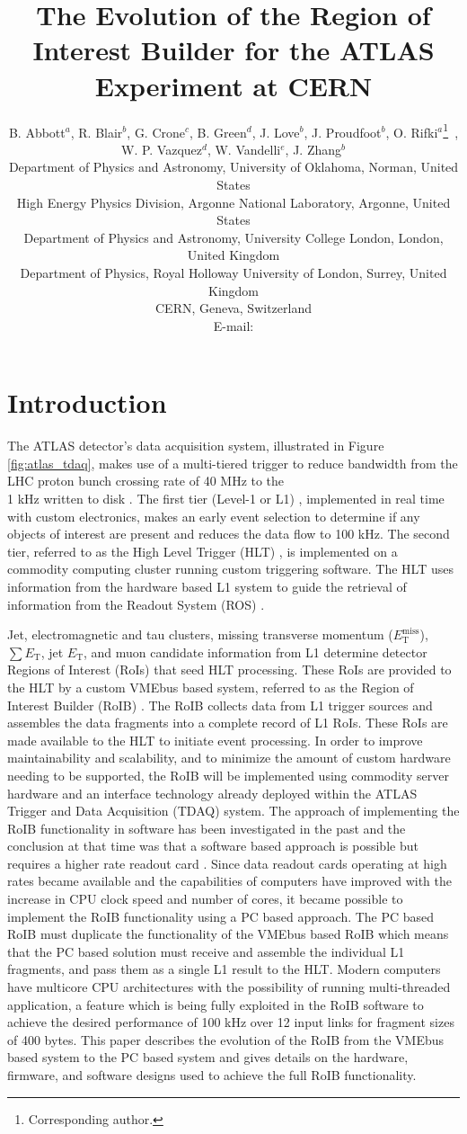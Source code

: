 \documentclass{JINST}
\title{The Evolution of the Region of Interest Builder for the ATLAS Experiment at CERN}
\author{B. Abbott$^a$,
R. Blair$^b$, 
G. Crone$^c$, 
B. Green$^d$, 
J. Love$^b$, 
J. Proudfoot$^b$, 
O. Rifki$^a$\thanks{Corresponding author.}~, 
W. P. Vazquez$^d$, 
W. Vandelli$^e$, 
J. Zhang$^b$\\
\llap{$^a$} Department of Physics and Astronomy, University of Oklahoma, Norman, United States\\
\llap{$^b$} High Energy Physics Division, Argonne National Laboratory, Argonne, United States\\
\llap{$^c$} Department of Physics and Astronomy, University College London, London, United Kingdom \\
\llap{$^d$} Department of Physics, Royal Holloway University of London, Surrey, United Kingdom\\
\llap{$^e$} CERN, Geneva, Switzerland\\
E-mail: \email{othmane.rifki@cern.ch}}
\begin{document}
\linenumbers


\section{Introduction}\label{sec:intro}

The ATLAS \cite{atlas} detector's data acquisition system, illustrated in Figure \ref{fig:atlas_tdaq}, makes use of a multi-tiered trigger to reduce 
bandwidth from the LHC proton bunch crossing rate of 40 MHz
to the \\1 kHz written to disk \cite{evolution}. The first tier (Level-1 or L1) \cite{l1}, implemented in real time with custom electronics, 
makes an early event selection to determine if any objects of interest are present and reduces the data flow to 
100 kHz. The second tier, referred to as the High Level Trigger (HLT) \cite{hlt}, is implemented on a commodity computing cluster running custom triggering software. The HLT uses information from the
hardware based L1 system to guide the retrieval of information from the Readout System (ROS) \cite{ros}. 

Jet, electromagnetic and tau clusters, missing transverse momentum ($E_{\mathrm{T}}^{\mathrm{miss}}$), $\sum E_{\mathrm{T}}$, 
jet $E_{\mathrm{T}}$, and muon candidate information from L1 determine detector Regions of Interest (RoIs) that seed HLT processing. These RoIs are provided to the HLT by a custom VMEbus based system, referred to as the Region of Interest Builder (RoIB) \cite{vme_roib}.
The RoIB collects data from L1 
trigger sources and assembles the data fragments into a complete record of L1 RoIs. These RoIs are made available to the HLT to initiate event processing. In order to improve maintainability and scalability, and to minimize the amount of custom hardware needing to be supported, 
the RoIB will be implemented using commodity server hardware and an interface technology already deployed 
within the ATLAS Trigger and Data Acquisition (TDAQ) system. The approach of implementing the RoIB functionality in software has been investigated in the past 
and the conclusion at that time was that a software based approach is possible but requires a higher rate readout card \cite{swroib_past}. 
Since data readout cards operating at high rates became available and the capabilities of computers have improved with the increase 
in CPU clock speed and number of cores, it became possible to implement the RoIB functionality using a PC based approach. 
The PC based RoIB must duplicate the functionality of the VMEbus based RoIB which means that the PC based solution must receive and assemble the
individual L1 fragments, and pass them as a single L1 result to the HLT. Modern computers have multicore CPU architectures 
with the possibility of running multi-threaded application, a feature which is being fully exploited in the RoIB software to achieve 
the desired performance of 100 kHz over 12 input links for fragment sizes of 400 bytes.  
This paper describes the evolution of the RoIB from the VMEbus based system to the PC based system and gives details on the hardware, 
firmware, and software designs used to achieve the full RoIB functionality. 
\end{document}
